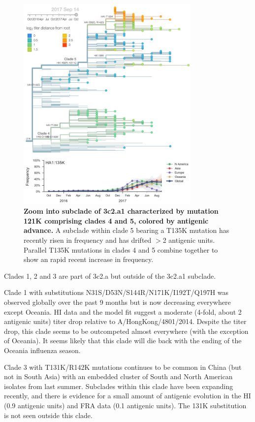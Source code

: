 \documentclass[11pt,oneside,letterpaper]{article}
\begin{document}
\begin{figure}[h!]
  \centering
  \includegraphics[width=0.8\textwidth]{../figures/sep-2017/h3n2_tree_135k.png}
  \caption{\textbf{Zoom into subclade of 3c2.a1 characterized by mutation 121K comprising clades 4 and 5, colored by antigenic advance.} A subclade within clade 5 bearing a T135K mutation has recently risen in frequency and has drifted $>$2 antigenic units.
  Parallel T135K mutations in clades 4 and 5 combine together to show an rapid recent increase in frequency.
  }
  \label{h3n2_tree_135k}
\end{figure}

Clades 1, 2 and 3 are part of 3c2.a but outside of the 3c2.a1 subclade.

Clade 1 with substitutions N31S/D53N/S144R/N171K/I192T/Q197H was observed globally over the past 9 months but is now decreasing everywhere except Oceania.
HI data and the model fit suggest a moderate (4-fold, about 2 antigenic units) titer drop relative to A/HongKong/4801/2014.
Despite the titer drop, this clade seems to be outcompeted almost everywhere (with the exception of Oceania).
It seems likely that this clade will die back with the ending of the Oceania influenza season.

Clade 3 with T131K/R142K mutations continues to be common in China (but
not in South Asia) with an embedded cluster of South and North American
isolates from last summer. Subclades within this clade have been
expanding recently, and there is evidence for a small amount of antigenic evolution
in the HI (0.9 antigenic units) and FRA data (0.1 antigenic units). The 131K substitution is not seen outside this
clade.
\end{document}
